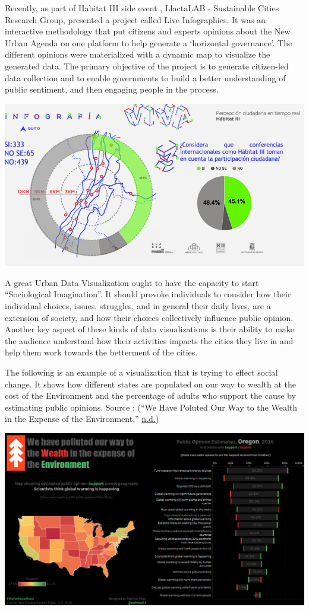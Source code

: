 \documentclass[]{book}
\begin{document}
Recently, as part of Habitat III side event , LlactaLAB - Sustainable Cities Research Group, presented a project called Live Infographics. It was an interactive methodology that put citizens and experts opinions about the New Urban Agenda on one platform to help generate a `horizontal governance'. The different opinions were materialized with a dynamic map to visualize the generated data. The primary objective of the project is to generate citizen-led data collection and to enable governments to build a better understanding of public sentiment, and then engaging people in the process.

\includegraphics{images/Habitat_Village.png}

A great Urban Data Visualization ought to have the capacity to start ``Sociological Imagination''. It should provoke individuals to consider how their individual choices, issues, struggles, and in general their daily lives, are a extension of society, and how their choices collectively influence public opinion. Another key aspect of these kinds of data visualizations is their ability to make the audience understand how their activities impacts the cities they live in and help them work towards the betterment of the cities.

The following is an example of a visualization that is trying to effect social change. It shows how different states are populated on our way to wealth at the cost of the Environment and the percentage of adults who support the cause by estimating public opinions. Source : (``We Have Poluted Our Way to the Wealth in the Expense of the Environment,'' \protect\hyperlink{ref-Yale_Climate_Opinion}{n.d.})

\includegraphics{images/social_change.PNG}
\end{document}
